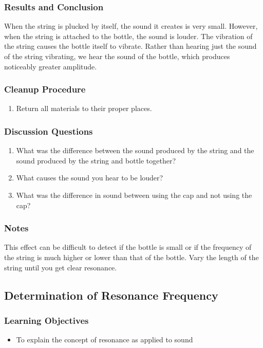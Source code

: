 \subsubsection*{Results and Conclusion}
When the string is plucked by itself, the sound it creates is very small.  However, when the string is attached to the bottle, the sound is louder.  The vibration of the string causes the bottle itself to vibrate.  Rather than hearing just the sound of the string vibrating, we hear the sound of the bottle, which produces noticeably greater amplitude.

\subsubsection*{Cleanup Procedure}
\begin{enumerate}
\item{Return all materials to their proper places.}
\end{enumerate}

\subsubsection*{Discussion Questions}
\begin{enumerate}
\item{What was the difference between the sound produced by the string and the sound produced by the string and bottle together?}
\item{What causes the sound you hear to be louder?}
\item{What was the difference in sound between using the cap and not using the cap?}
\end{enumerate}

\subsubsection*{Notes}
This effect can be difficult to detect if the bottle is small or if the frequency of the string is much higher or lower than that of the bottle.  Vary the length of the string until you get clear resonance.

\subsection{Determination of Resonance Frequency}

\subsubsection*{Learning Objectives}
\begin{itemize}
\item{To explain the concept of resonance as applied to sound} 
\end{itemize}

